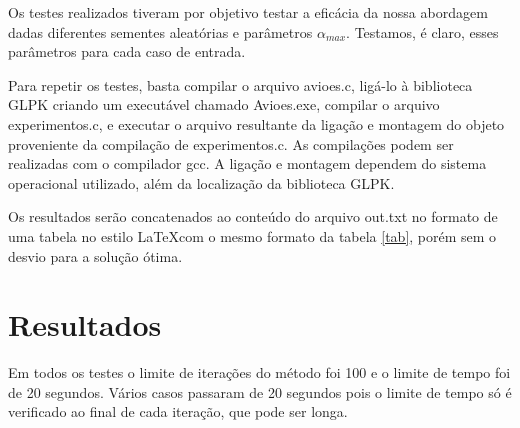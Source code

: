 \documentclass[a4paper,10pt]{abnt} %
\begin{document}
Os testes realizados tiveram por objetivo testar a eficácia da nossa abordagem dadas diferentes sementes aleatórias e parâmetros $\alpha_{max}$. Testamos, é claro, esses parâmetros para cada caso de entrada.

Para repetir os testes, basta compilar o arquivo avioes.c, ligá-lo à biblioteca GLPK criando um executável chamado Avioes.exe, compilar o arquivo experimentos.c, e executar o arquivo resultante da ligação e montagem do objeto proveniente da compilação de experimentos.c. As compilações podem ser realizadas com o compilador gcc. A ligação e montagem dependem do sistema operacional utilizado, além da localização da biblioteca GLPK.

Os resultados serão concatenados ao conteúdo do arquivo out.txt no formato de uma tabela no estilo \LaTeX com o mesmo formato da tabela \ref{tab}, porém sem o desvio para a solução ótima.

\section{Resultados}

Em todos os testes o limite de iterações do método foi 100 e o limite de tempo foi de 20 segundos. Vários casos passaram de 20 segundos pois o limite de tempo só é verificado ao final de cada iteração, que pode ser longa.
\end{document}

